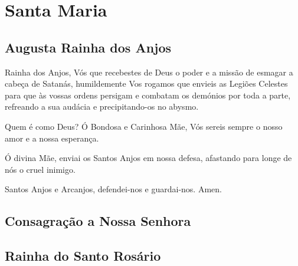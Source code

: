 
\section{Santa Maria}

\subsection{Augusta Rainha dos Anjos}

 Rainha dos Anjos, Vós que recebestes de Deus o poder e a missão de esmagar a cabeça de Satanás, humildemente Vos rogamos que envieis as Legiões Celestes para que às vossas ordens persigam e combatam os demónios por toda a parte, refreando a sua audácia e precipitando-os no abysmo.\par
Quem é como Deus? Ó Bondosa e Carinhosa Mãe, Vós sereis sempre o nosso amor e a nossa esperança.\par
Ó divina Mãe, enviai os Santos Anjos em nossa defesa, afastando para longe de nós o cruel inimigo.\par
Santos Anjos e Arcanjos, defendei-nos e guardai-nos. Amen.\par

\subsection{Consagração a Nossa Senhora}

\begin{paracol}{2}\switchcolumn{}\switchcolumn*{}\switchcolumn{}\switchcolumn*{}\switchcolumn{}\end{paracol}

\subsection{Rainha do Santo Rosário}


